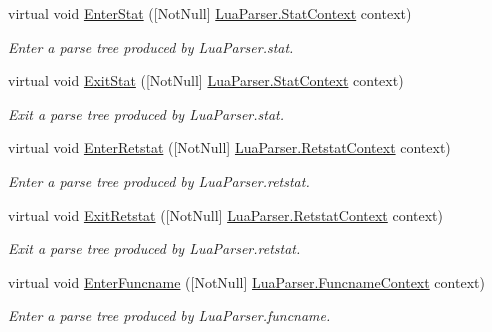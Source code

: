 \begin{DoxyCompactItemize}
virtual void \mbox{\hyperlink{classzlua_1_1_lua_base_listener_a863cb95dc744fd28f9194958e1d42341}{Enter\+Stat}} (\mbox{[}Not\+Null\mbox{]} \mbox{\hyperlink{classzlua_1_1_lua_parser_1_1_stat_context}{Lua\+Parser.\+Stat\+Context}} context)
\begin{DoxyCompactList}\small\item\em Enter a parse tree produced by Lua\+Parser.\+stat. \end{DoxyCompactList}\item 
virtual void \mbox{\hyperlink{classzlua_1_1_lua_base_listener_abf60a39c358a7aafc2ddaa2fbb05d49d}{Exit\+Stat}} (\mbox{[}Not\+Null\mbox{]} \mbox{\hyperlink{classzlua_1_1_lua_parser_1_1_stat_context}{Lua\+Parser.\+Stat\+Context}} context)
\begin{DoxyCompactList}\small\item\em Exit a parse tree produced by Lua\+Parser.\+stat. \end{DoxyCompactList}\item 
virtual void \mbox{\hyperlink{classzlua_1_1_lua_base_listener_a48c1d90a5dbcce92c8f3f30e7a413f25}{Enter\+Retstat}} (\mbox{[}Not\+Null\mbox{]} \mbox{\hyperlink{classzlua_1_1_lua_parser_1_1_retstat_context}{Lua\+Parser.\+Retstat\+Context}} context)
\begin{DoxyCompactList}\small\item\em Enter a parse tree produced by Lua\+Parser.\+retstat. \end{DoxyCompactList}\item 
virtual void \mbox{\hyperlink{classzlua_1_1_lua_base_listener_a8b590e84f7634f57b233bc7df33591e6}{Exit\+Retstat}} (\mbox{[}Not\+Null\mbox{]} \mbox{\hyperlink{classzlua_1_1_lua_parser_1_1_retstat_context}{Lua\+Parser.\+Retstat\+Context}} context)
\begin{DoxyCompactList}\small\item\em Exit a parse tree produced by Lua\+Parser.\+retstat. \end{DoxyCompactList}\item 
virtual void \mbox{\hyperlink{classzlua_1_1_lua_base_listener_adae5a9d925d77bceb832b62f7ce47766}{Enter\+Funcname}} (\mbox{[}Not\+Null\mbox{]} \mbox{\hyperlink{classzlua_1_1_lua_parser_1_1_funcname_context}{Lua\+Parser.\+Funcname\+Context}} context)
\begin{DoxyCompactList}\small\item\em Enter a parse tree produced by Lua\+Parser.\+funcname. \end{DoxyCompactList}\item 

\end{DoxyCompactItemize}
